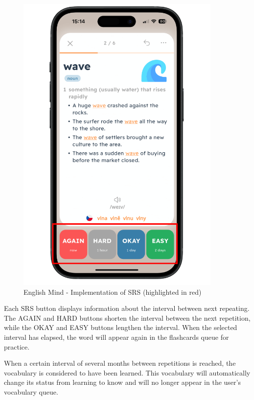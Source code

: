 \begin{figure}[!h]
    \includegraphics[width=0.9\textwidth]{src/figures/em-srs-flashcard.png}
    \caption{English Mind - Implementation of SRS (highlighted in red)}
    \label{fig:em-srs-flashcard}
\end{figure}

Each SRS button displays information about the interval between next repeating. The AGAIN and HARD buttons shorten the interval between the next repetition, while the OKAY and EASY buttons lengthen the interval. When the selected interval has elapsed, the word will appear again in the flashcards queue for practice.

When a certain interval of several months between repetitions is reached, the vocabulary is considered to have been learned. This vocabulary will automatically change its status from learning to know and will no longer appear in the user's vocabulary queue.
